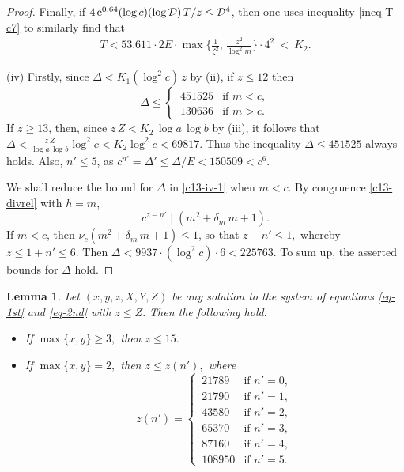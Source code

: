 \documentclass[11pt]{amsart}
\newtheorem{lem}{Lemma}[section]
\numberwithin{equation}{section}
\begin{document}
\begin{proof}
Finally, if $4\,{\rm e}^{0.64}(\log c)(\log \mathcal D)\,T/z \le \mathcal D^4$, then one uses inequality \eqref{ineq-T-c7} to similarly find that
\begin{align*}
T
<53.611\cdot 2E\cdot \max\biggr\{\frac{1}{\zeta^2},\,
\frac{z^2}{\log^2 m}\biggr\} \cdot 4^2 
\ < \ K_2.
\end{align*}
\par
(iv) Firstly, since $\Delta<K_1(\log^2 c)\,z$ by (ii), if $z \le 12$ then
\begin{equation} \label{c13-iv-1}
\Delta \le
\begin{cases}
\,451525 & \text{if $m<c,$} \\
\,130636 & \text{if $m>c.$}
\end{cases}
\end{equation}
If $z \ge 13$, then, since $z\,Z < K_2\,\log a\,\log b$ by (iii), it follows that $\Delta<\frac{z\,Z}{\log a \, \log b} \log^2 c < K_2\log^2 c< 69817$. 
Thus the inequality $\Delta \le 451525$ always holds. 
Also, $n' \le 5$, as $c^{n'}=\Delta' \le \Delta/E<150509<c^6$.

We shall reduce the bound for $\Delta$ in \eqref{c13-iv-1} when $m<c$. 
By congruence \eqref{c13-divrel} with $h=m$, 
\begin{equation} \label{c13-divrel-m}
c^{z-n'} \mid (m^2+\delta_m \,m+1).
\end{equation}
If $m<c$, then $\nu_c(m^2+\delta_m \,m+1) \le 1$, so that $z-n' \le 1,$ whereby $z \le 1+n' \le 6$.
Then $\Delta<9937 \cdot (\log^2 c) \cdot 6<225763$. 
To sum up, the asserted bounds for $\Delta$ hold.
\end{proof}

\begin{lem} \label{lem-c7-v-vi}
Let $(x,y,z,X,Y,Z)$ be any solution to the system of equations \eqref{eq-1st} and \eqref{eq-2nd} with $z \le Z.$
Then the following hold.
\begin{itemize}
\item[(i)] If $\max\{x,y\} \ge 3,$ then $z \le 15.$
\item[(ii)] If $\max\{x,y\}=2,$ then $z \le z(n'),$ where
\[ z(n')= \begin{cases}
\,21789 & \text{if $n'=0$}, \\
\,21790 & \text{if $n'=1$}, \\
\,43580 & \text{if $n'=2$}, \\
\,65370 & \text{if $n'=3$}, \\
\,87160 & \text{if $n'=4$}, \\
\,108950 & \text{if $n'=5$}.
\end{cases} \]
\end{itemize}
\end{lem}
\end{document}
